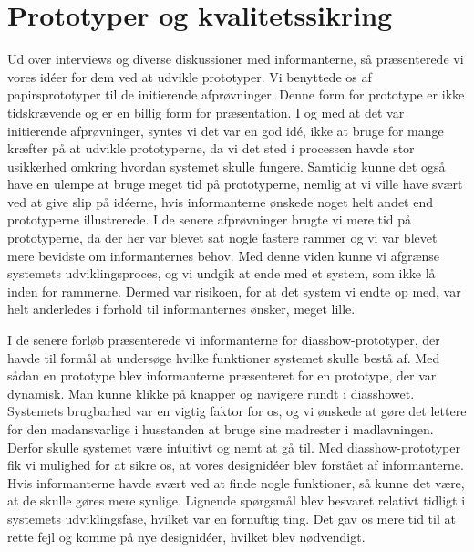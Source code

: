 \section{Prototyper og kvalitetssikring}
Ud over interviews og diverse diskussioner med informanterne, så præsenterede vi vores idéer for dem ved at udvikle prototyper. Vi benyttede os af papirsprototyper til de initierende afprøvninger. Denne form for prototype er ikke tidskrævende og er en billig form for præsentation. I og med at det var initierende afprøvninger, syntes vi det var en god idé, ikke at bruge for mange kræfter på at udvikle prototyperne, da vi det sted i processen havde stor usikkerhed omkring hvordan systemet skulle fungere. Samtidig kunne det også have en ulempe at bruge meget tid på prototyperne, nemlig at vi ville have svært ved at give slip på idéerne, hvis informanterne ønskede noget helt andet end prototyperne illustrerede. I de senere afprøvninger brugte vi mere tid på prototyperne, da der her var blevet sat nogle fastere rammer og vi var blevet mere bevidste om informanternes behov. Med denne viden kunne vi afgrænse systemets udviklingsproces, og vi undgik at ende med et system, som ikke lå inden for rammerne. Dermed var risikoen, for at det system vi endte op med, var helt anderledes i forhold til informanternes ønsker, meget lille.

I de senere forløb præsenterede vi informanterne for diasshow-prototyper, der havde til formål at undersøge hvilke funktioner systemet skulle bestå af. Med sådan en prototype blev informanterne præsenteret for en prototype, der var dynamisk. Man kunne klikke på knapper og navigere rundt i diasshowet. Systemets brugbarhed var en vigtig faktor for os, og vi ønskede at gøre det lettere for den madansvarlige i husstanden at bruge sine madrester i madlavningen. Derfor skulle systemet være intuitivt og nemt at gå til. Med diasshow-prototyper fik vi mulighed for at sikre os, at vores designidéer blev forstået af informanterne. Hvis informanterne \fx havde svært ved at finde nogle funktioner, så kunne det være, at de skulle gøres mere synlige. Lignende spørgsmål blev besvaret relativt tidligt i systemets udviklingsfase, hvilket var en fornuftig ting. Det gav os mere tid til at rette fejl og komme på nye designidéer, hvilket blev nødvendigt.

